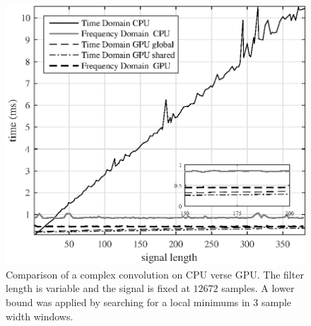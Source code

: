 \begin{figure}
	\centering\includegraphics[width=5in]{figures/gpu_intro/CPUvsGPU_1batch_12672signal_varyFilter.eps}
	\caption{Comparison of a complex convolution on CPU verse GPU. The filter length is variable and the signal is fixed at $12672$ samples. A lower bound was applied by searching for a local minimums in 3 sample width windows.}
	\label{fig:CPUvsGPU_1batch_12672signal_varyFilter}
\end{figure}


